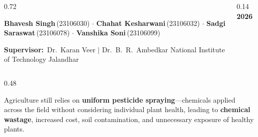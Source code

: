 \documentclass[final,t]{beamer}
\begin{document}
\begin{frame}[t]{}
\begin{tcolorbox}
\begin{columns}[c]
\begin{column}{0.72\textwidth}
  \vspace{14pt}

  {\normalsize\color{white}%
    \textbf{Bhavesh Singh}\,\textcolor{GreenMid}{\scriptsize (23106030)}
    \enspace$\cdot$\enspace
    \textbf{Chahat Kesharwani}\,\textcolor{GreenMid}{\scriptsize (23106032)}
    \enspace$\cdot$\enspace
    \textbf{Sadgi Saraswat}\,\textcolor{GreenMid}{\scriptsize (23106078)}
    \enspace$\cdot$\enspace
    \textbf{Vanshika Soni}\,\textcolor{GreenMid}{\scriptsize (23106099)}\par}
  \vspace{8pt}

  {\small\color{white!85}%
    \textbf{Supervisor:}~Dr.~Karan Veer
    \enspace$|$\enspace
    Dr.~B.~R.~Ambedkar National Institute of Technology Jalandhar\par}
\end{column}

\begin{column}{0.14\textwidth}
  \centering
  {\color{GreenMid}\fontsize{72}{72}\selectfont\bfseries
    \textcolor{white!10}{2026}}
\end{column}

\end{columns}
\end{tcolorbox}

\vspace{0.6cm}

\begin{columns}[T]

\begin{column}{0.48\textwidth}

\begin{posterbox}[title=1~~Motivation \& Problem Statement]
\justifying
Agriculture still relies on \textbf{uniform pesticide spraying}---chemicals applied
across the field without considering individual plant health, leading to
\textbf{chemical wastage}, increased cost, soil contamination, and unnecessary
exposure of healthy plants.


\end{posterbox}
\end{column}
\end{columns}
\end{frame}
\end{document}
